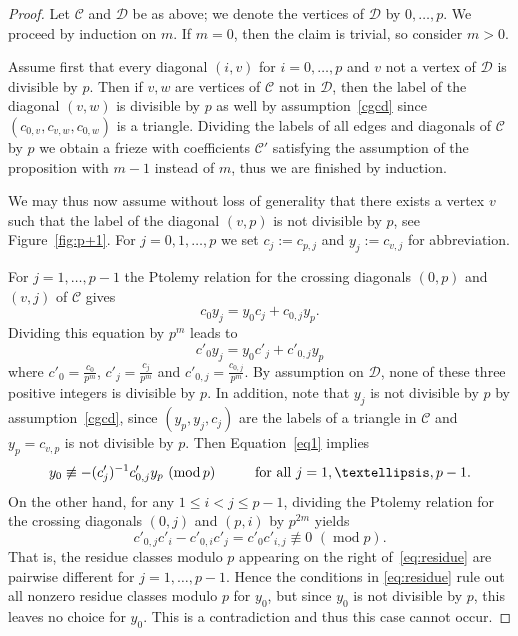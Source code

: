 \documentclass[10pt]{amsart}
\numberwithin{equation}{section}
\theoremstyle{definition}
\theoremstyle{remark}
\DeclareMathOperator{\md}{mod}
\begin{document}
\begin{proof}
Let $\mathcal{C}$ and $\mathcal{D}$ be as above; we denote the vertices of $\mathcal{D}$ by $0,\ldots,p$.
We proceed by induction on $m$. If $m=0$, then the claim is trivial, so consider $m>0$.

Assume first that every diagonal $(i,v)$ for $i=0,\ldots,p$ and $v$ not a vertex of $\mathcal{D}$ is divisible by $p$.
Then if $v,w$ are vertices of $\mathcal{C}$ not in $\mathcal{D}$, then the 
label of the diagonal $(v,w)$ is divisible by $p$ as well by assumption~\eqref{cgcd} since $(c_{0,v},c_{v,w},c_{0,w})$ is a triangle.
Dividing the labels of all edges and diagonals of $\mathcal{C}$ by $p$ we obtain a frieze with coefficients $\mathcal{C'}$ satisfying the assumption of the proposition with $m-1$ instead of $m$, thus we are finished by induction.

We may thus now assume without loss of generality that there exists a vertex $v$ such that the label
of the diagonal $(v,p)$ is not divisible by $p$, see Figure~\ref{fig:p+1}.
For $j=0,1,\ldots,p$ we set $c_j:=c_{p,j}$ and $y_j:=c_{v,j}$ for abbreviation.

For $j=1,\ldots,p-1$ 
the Ptolemy relation for the crossing diagonals $(0,p)$ and $(v,j)$ of 
$\mathcal{C}$ gives
\[
c_0y_j = y_0c_j + c_{0,j}y_p.
\]
Dividing this equation by $p^m$ leads to
\begin{equation} \label{eq1}
 c'_0y_j = y_0c'_j + c'_{0,j}y_p
\end{equation}
where $c'_0=\frac{c_0}{p^m}$, $c'_j=\frac{c_j}{p^m}$ and
$c'_{0,j}=\frac{c_{0,j}}{p^m}$. By assumption on $\mathcal{D}$, none of 
these three positive integers is divisible by $p$. 
In addition, note that $y_j$ is not divisible by $p$ by assumption~\eqref{cgcd}, since
$(y_p,y_j,c_j)$ are the labels of a triangle in $\mathcal{C}$ and 
$y_p=c_{v,p}$ is not divisible by $p$.
Then Equation~\eqref{eq1} implies
\begin{equation} \label{eq:residue}
y_0\not\equiv -(c'_j)^{-1} c'_{0,j} y_p\,\,(\md p)
\mbox{\hskip1cm 
for all $j=1,\ldots,p-1$}.
\end{equation}
On the other hand, for any $1\le i< j\le p-1$, dividing the Ptolemy relation for the crossing diagonals
$(0,j)$ and $(p,i)$ by $p^{2m}$ yields 
\[
c'_{0,j} c'_i - c'_{0,i}c'_j = c'_0c'_{i,j} \not\equiv 0
\,\,(\md  p).
\]
That is, the residue classes modulo $p$
appearing on the right of~\eqref{eq:residue}
are pairwise different for $j=1,\ldots,p-1$. Hence the conditions in
\eqref{eq:residue} rule out all nonzero residue classes modulo $p$
for $y_0$, but
since $y_0$ is not divisible by $p$, this leaves no choice for $y_0$. 
This is a contradiction and thus this case cannot occur.
\end{proof}
\end{document}
